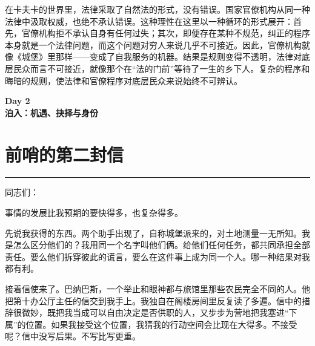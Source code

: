 \documentclass[12pt,a4paper]{article}
\begin{document}
在卡夫卡的世界里，法律采取了自然法的形式，没有错误。国家官僚机构从同一种法律中汲取权威，也绝不承认错误。这种理性在这里以一种循环的形式展开：首先，官僚机构拒不承认自身有任何过失；其次，即便存在某种不规范，纠正的程序本身就是一个法律问题，而这个问题对穷人来说几乎不可接近。因此，官僚机构就像《城堡》里那样——变成了自我服务的机器。结果是规则变得不透明，法律对底层民众而言不可接近，就像那个在“法的门前”等待了一生的乡下人。复杂的程序和晦暗的规则，使法律和官僚程序对底层民众来说始终不可辨认。
\par{}
\newpage
\begin{center}
{\LARGE \bfseries Day 2\\[1em]泊入：机遇、抉择与身份}
\end{center}
\vspace{3em}
\section{前哨的第二封信}
\vspace{0.5em}
\vspace{0.3em}

\noindent\rule{\textwidth}{0.4pt}

\vspace{0.3em}



同志们：



事情的发展比我预期的要快得多，也复杂得多。



先说我获得的东西。两个助手出现了，自称城堡派来的，对土地测量一无所知。我是怎么区分他们的？我用同一个名字叫他们俩。给他们任何任务，都共同承担全部责任。要么他们拆穿彼此的谎言，要么在这件事上成为同一个人。哪一种结果对我都有利。



接着信使来了。巴纳巴斯，一个举止和眼神都与旅馆里那些农民完全不同的人。他把第十办公厅主任的信交到我手上。我独自在阁楼房间里反复读了多遍。信中的措辞很微妙，既把我当成可以自由决定是否供职的人，又步步为营地把我塞进“下属”的位置。如果我接受这个位置，我猜我的行动空间会比现在大得多。不接受呢？信中没写后果。不写比写更重。
\end{document}
